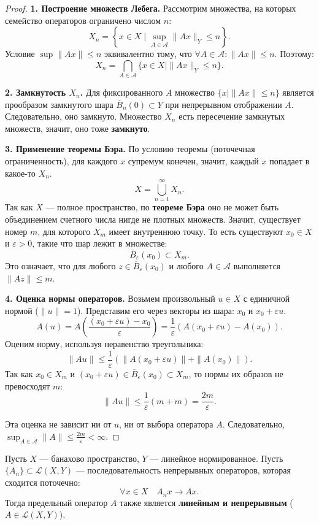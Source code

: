 \begin{proof}
	\textbf{1. Построение множеств Лебега.}
	Рассмотрим множества, на которых семейство операторов ограничено числом $n$:
	\[ X_n = \left\{x \in X \mid \sup_{A \in \mathcal{A}} \|Ax\|_Y \leqslant n \right\}. \]
	Условие $\sup \|Ax\| \leqslant n$ эквивалентно тому, что $\forall A \in \mathcal{A}: \|Ax\| \leqslant n$. Поэтому:
	\[ X_n = \bigcap_{A \in \mathcal{A}} \{x \in X \mid \|Ax\|_Y \leqslant n\}. \]
	
	\textbf{2. Замкнутость $X_n$.}
	Для фиксированного $A$ множество $\{x \mid \|Ax\| \leqslant n\}$ является прообразом замкнутого шара $\overline{B}_n(0) \subset Y$ при непрерывном отображении $A$. Следовательно, оно замкнуто.
	Множество $X_n$ есть пересечение замкнутых множеств, значит, оно тоже \textbf{замкнуто}.
	
	\textbf{3. Применение теоремы Бэра.}
	По условию теоремы (поточечная ограниченность), для каждого $x$ супремум конечен, значит, каждый $x$ попадает в какое-то $X_n$.
	\[ X = \bigcup_{n=1}^{\infty} X_n. \]
	Так как $X$ — полное пространство, по \textbf{теореме Бэра} оно не может быть объединением счетного числа нигде не плотных множеств. Значит, существует номер $m$, для которого $X_m$ имеет внутреннюю точку.
	То есть существуют $x_0 \in X$ и $\varepsilon > 0$, такие что шар лежит в множестве:
	\[ \overline{B}_\varepsilon(x_0) \subset X_m. \]
	Это означает, что для любого $z \in \overline{B}_\varepsilon(x_0)$ и любого $A \in \mathcal{A}$ выполняется $\|Az\| \leqslant m$.
	
	\textbf{4. Оценка нормы операторов.}
	Возьмем произвольный $u \in X$ с единичной нормой ($\|u\|=1$).
	Представим его через векторы из шара: $x_0$ и $x_0 + \varepsilon u$.
	\[ A(u) = A\left( \frac{(x_0 + \varepsilon u) - x_0}{\varepsilon} \right) = \frac{1}{\varepsilon} (A(x_0 + \varepsilon u) - A(x_0)). \]
	Оценим норму, используя неравенство треугольника:
	\[ \|Au\| \leqslant \frac{1}{\varepsilon} \left( \|A(x_0 + \varepsilon u)\| + \|A(x_0)\| \right). \]
	Так как $x_0 \in X_m$ и $(x_0 + \varepsilon u) \in \overline{B}_\varepsilon(x_0) \subset X_m$, то нормы их образов не превосходят $m$:
	\[ \|Au\| \leqslant \frac{1}{\varepsilon} (m + m) = \frac{2m}{\varepsilon}. \]
	
	Эта оценка не зависит ни от $u$, ни от выбора оператора $A$.
	Следовательно, $\sup_{A \in \mathcal{A}} \|A\| \leqslant \frac{2m}{\varepsilon} < \infty$.
\end{proof}

\begin{corollary}
	Пусть $X$ — банахово пространство, $Y$ — линейное нормированное.
	Пусть $\{A_n\} \subset \mathcal{L}(X, Y)$ — последовательность непрерывных операторов, которая сходится поточечно:
	\[ \forall x \in X \quad A_n x \to A x. \]
	Тогда предельный оператор $A$ также является \textbf{линейным и непрерывным} ($A \in \mathcal{L}(X, Y)$).
\end{corollary}

